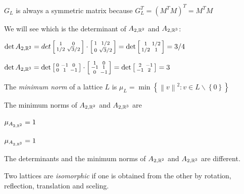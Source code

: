 \begin{observation}
 $G_L$ is always a symmetric matrix because $G_L^{T}=\left(M^{T}M\right)^{T}=M^{T}M$
\end{observation}


We will see which is the determinant of $A_{2,\mathbb{R}^{2}}$ and $A_{2,\mathbb{R}^{3}}$:

$\det A_{2,\mathbb{R}^{2}}=det \left[\begin{smallmatrix}
1 & 0 \\
1/2 & \sqrt{3}/2 \end{smallmatrix}\right]\cdot\left[\begin{smallmatrix}
1 & 1/2 \\
0 & \sqrt{3}/2 \end{smallmatrix}\right]=\det \left[\begin{smallmatrix}
1 & 1/2 \\
1/2 & 1 \end{smallmatrix}\right]=3/4$

$\det A_{2,\mathbb{R}^{3}}=\det \left[\begin{smallmatrix}
0 & -1 & 0 \\
0 & 1 & -1\end{smallmatrix}\right]\cdot\left[\begin{smallmatrix}
1 & 0 \\
-1 & 1 \\
0 & -1 \end{smallmatrix}\right]=\det \left[\begin{smallmatrix}
2 & -1 \\
-1 & 2 \end{smallmatrix}\right]=3$


\begin{definition}
The \emph{minimum norm} of a lattice $L$ is $\mu_L=\min\left\{\left\|v\right\|^{2}:v\in L\backslash \left\{0\right\}\right\}$
\end{definition}


The minimum norms of $A_{2,\mathbb{R}^{2}}$ and $A_{2,\mathbb{R}^{3}}$ are

$\mu_{A_{2,\mathbb{R}^{2}}} = 1$

$\mu_{A_{2,\mathbb{R}^{3}}} = 1$

The determinants and the minimum norms of $A_{2,\mathbb{R}^{2}}$ and $A_{2,\mathbb{R}^{3}}$ are different.


\begin{definition}
Two lattices are \emph{isomorphic} if one is obtained from the other by rotation, reflection, translation and sceling.
\end{definition}


